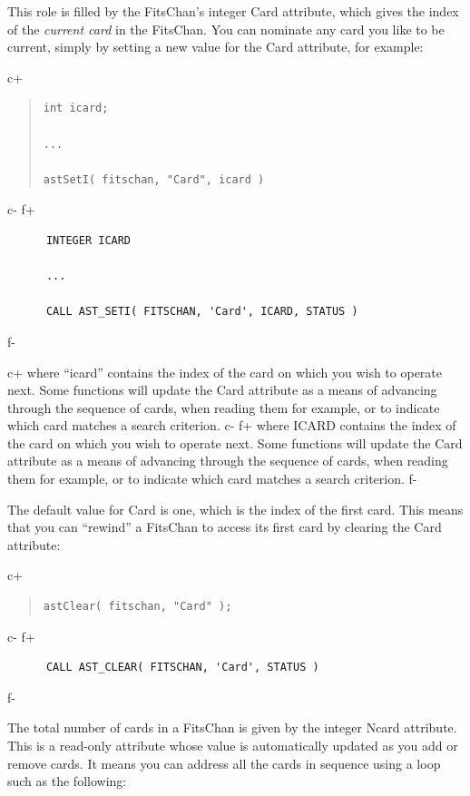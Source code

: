 \documentclass[twoside,11pt]{article}
\begin{document}
This role is filled by the FitsChan's integer Card attribute, which
gives the index of the {\em{current card}} in the FitsChan.  You can
nominate any card you like to be current, simply by setting a new
value for the Card attribute, for example:

c+
\begin{quote}
\small
\begin{verbatim}
int icard;

...

astSetI( fitschan, "Card", icard )
\end{verbatim}
\normalsize
\end{quote}
c-
f+
\small
\begin{verbatim}
      INTEGER ICARD

      ...

      CALL AST_SETI( FITSCHAN, 'Card', ICARD, STATUS )
\end{verbatim}
\normalsize
f-

c+
where ``icard'' contains the index of the card on which you wish to
operate next.  Some functions will update the Card attribute as a
means of advancing through the sequence of cards, when reading them
for example, or to indicate which card matches a search criterion.
c-
f+
where ICARD contains the index of the card on which you wish to
operate next.  Some functions will update the Card attribute as a
means of advancing through the sequence of cards, when reading them
for example, or to indicate which card matches a search criterion.
f-

The default value for Card is one, which is the index of the first
card. This means that you can ``rewind'' a FitsChan to access its
first card by clearing the Card attribute:

c+
\begin{quote}
\small
\begin{verbatim}
astClear( fitschan, "Card" );
\end{verbatim}
\normalsize
\end{quote}
c-
f+
\small
\begin{verbatim}
      CALL AST_CLEAR( FITSCHAN, 'Card', STATUS )
\end{verbatim}
\normalsize
f-

The total number of cards in a FitsChan is given by the integer Ncard
attribute. This is a read-only attribute whose value is automatically
updated as you add or remove cards. It means you can address all the
cards in sequence using a loop such as the following:
\end{document}
